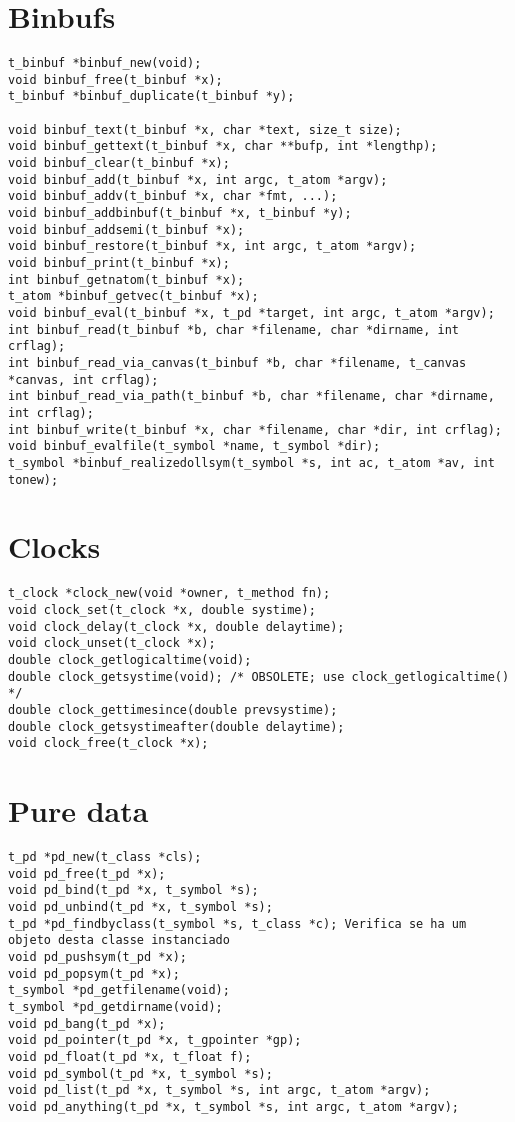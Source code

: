 \section{Binbufs}
\begin{lstlisting}
t_binbuf *binbuf_new(void);
void binbuf_free(t_binbuf *x);
t_binbuf *binbuf_duplicate(t_binbuf *y);

void binbuf_text(t_binbuf *x, char *text, size_t size);
void binbuf_gettext(t_binbuf *x, char **bufp, int *lengthp);
void binbuf_clear(t_binbuf *x);
void binbuf_add(t_binbuf *x, int argc, t_atom *argv);
void binbuf_addv(t_binbuf *x, char *fmt, ...);
void binbuf_addbinbuf(t_binbuf *x, t_binbuf *y);
void binbuf_addsemi(t_binbuf *x);
void binbuf_restore(t_binbuf *x, int argc, t_atom *argv);
void binbuf_print(t_binbuf *x);
int binbuf_getnatom(t_binbuf *x);
t_atom *binbuf_getvec(t_binbuf *x);
void binbuf_eval(t_binbuf *x, t_pd *target, int argc, t_atom *argv);
int binbuf_read(t_binbuf *b, char *filename, char *dirname, int crflag);
int binbuf_read_via_canvas(t_binbuf *b, char *filename, t_canvas *canvas, int crflag);
int binbuf_read_via_path(t_binbuf *b, char *filename, char *dirname, int crflag);
int binbuf_write(t_binbuf *x, char *filename, char *dir, int crflag);
void binbuf_evalfile(t_symbol *name, t_symbol *dir);
t_symbol *binbuf_realizedollsym(t_symbol *s, int ac, t_atom *av, int tonew);
\end{lstlisting}

\section{Clocks}
\begin{lstlisting}
t_clock *clock_new(void *owner, t_method fn);
void clock_set(t_clock *x, double systime);
void clock_delay(t_clock *x, double delaytime);
void clock_unset(t_clock *x);
double clock_getlogicaltime(void);
double clock_getsystime(void); /* OBSOLETE; use clock_getlogicaltime() */
double clock_gettimesince(double prevsystime);
double clock_getsystimeafter(double delaytime);
void clock_free(t_clock *x);
\end{lstlisting}

\section{Pure data}
\begin{lstlisting}
t_pd *pd_new(t_class *cls);
void pd_free(t_pd *x);
void pd_bind(t_pd *x, t_symbol *s);
void pd_unbind(t_pd *x, t_symbol *s);
t_pd *pd_findbyclass(t_symbol *s, t_class *c); Verifica se ha um objeto desta classe instanciado
void pd_pushsym(t_pd *x);
void pd_popsym(t_pd *x);
t_symbol *pd_getfilename(void);
t_symbol *pd_getdirname(void);
void pd_bang(t_pd *x);
void pd_pointer(t_pd *x, t_gpointer *gp);
void pd_float(t_pd *x, t_float f);
void pd_symbol(t_pd *x, t_symbol *s);
void pd_list(t_pd *x, t_symbol *s, int argc, t_atom *argv);
void pd_anything(t_pd *x, t_symbol *s, int argc, t_atom *argv);
\end{lstlisting}

